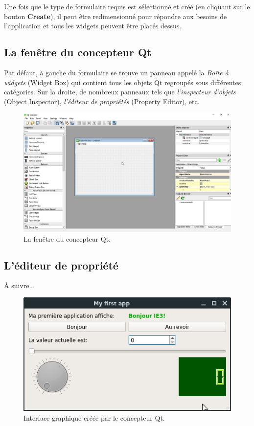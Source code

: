 \documentclass[%
oneside,                 %
final,                   %
10pt,french]{article}
\begin{document}
Une fois que le type de formulaire requis est sélectionné et créé (en cliquant sur le bouton \textbf{Create}), il peut être redimensionné pour répondre aux besoins de l'application et tous les widgets peuvent être placés dessus.

\subsection{La fenêtre du concepteur Qt}
Par défaut, à gauche du formulaire se trouve un panneau appelé la \emph{Boîte à widgets} (Widget Box) qui contient tous les objets Qt regroupés sous différentes catégories. Sur la droite, de nombreux panneaux tels que \emph{l'inspecteur d'objets} (Object Inspector), \emph{l'éditeur de propriétés} (Property Editor), etc.


\begin{figure}[!ht]  %
  \centerline{\includegraphics[width=0.9\linewidth]{imgs/designerWindow.png}}
  \caption{
  La fenêtre du concepteur Qt. \label{fig:designerWindow}
  }
\end{figure}


\subsection{L'éditeur de propriété}

À suivre...


\begin{figure}[!ht]  %
  \centerline{\includegraphics[width=0.4\linewidth]{imgs/myfirstappDesigner.png}}
  \caption{
  Interface graphique créée par le concepteur Qt. \label{fig:myfirstappDesigner}
  }
\end{figure}



\end{document}

